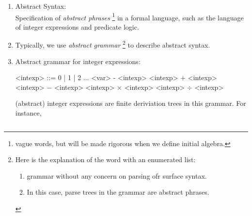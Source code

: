 \begin{enumerate}[label=\protect\circled{\arabic*}]
  \item Abstract Syntax: \\
    Specification of \emph{abstract phrases}
    \footnote{
      vague words, but will be made rigorous when we define initial algebra.
    }
    in a formal language, such as the language of integer expressions and
    predicate logic.
  \item
    Typically, we use \emph{abstract grammar}
    \footnote{
      \begin{minipage}[t]{\textwidth}
      Here is the explanation of the word with an enumerated list:
      \begin{enumerate}[label=(\roman*)]
        \item grammar without any concern on parsing ofr surface syntax.
        \item In this case, parse trees in the grammar are abstract phrases.
      \end{enumerate}
      \end{minipage}
    }
    to describe abstract syntax.
  \item Abstract grammar for integer expressions:
    \setlength{\grammarindent}{6em} %
    \begin{center}
    \begin{minipage}{0.4\textwidth}
    \begin{grammar}
    <intexp> ::= 0 | 1 | 2 ...
    \alt <var>
    \alt - <intexp>
    \alt <intexp> $+$ <intexp>
    \alt <intexp> $-$ <intexp>
    \alt <intexp> $\times$ <intexp>
    \alt <intexp> $\div$ <intexp>
    \end{grammar}
    \end{minipage}
    \end{center}
    (abstract) integer expressions are finite deriviation trees in this grammar.
    For instance,

    \begin{center}
    $\qquad$
    \begin{tikzpicture}[
      level 1/.style={sibling distance=20mm, level distance=10mm},
      level 2/.style={sibling distance=10mm},
      level 3/.style={sibling distance=5mm}]


\end{tikzpicture}
\end{center}
\end{enumerate}
